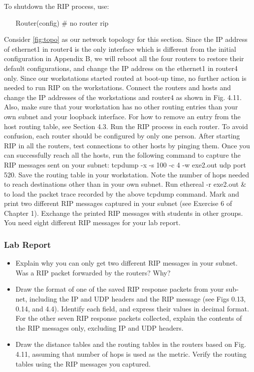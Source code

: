 \documentclass[10pt,a4paper]{article}
\numberwithin{equation}{section}
\numberwithin{figure}{section}
\numberwithin{table}{section}
\begin{document}
 To shutdown the RIP process, use:
 \begin{itemize}
	\setlength{\itemindent}{60pt}
	\item [Router(config) \#] no router rip
\end{itemize}

Consider \ref{fig:topo} as our network topology for this section. Since the IP
address of ethernet1 in router4 is the only interface which is different from the initial configuration in Appendix B, we will reboot all the four routers to restore their default configurations, and change the IP address on the ethernet1 in router4 only. Since our workstations started routed at boot-up time, no further action is needed to run RIP on the workstations.
Connect the routers and hosts and change the IP addresses of the workstations and router4 as shown in Fig. 4.11. Also, make sure that your workstation has no other routing entries than your own subnet and your loopback interface. For how to remove an entry from the host routing table, see Section 4.3.
Run the RIP process in each router. To avoid confusion, each router should be configured by only one person.
After starting RIP in all the routers, test connections to other hosts by pinging them. Once you can successfully reach all the hosts, run the following command to capture the RIP messages sent on your subnet:
tcpdump -x -s 100 -c 4 -w exe2.out udp port 520.
Save the routing table in your workstation. Note the number of hops needed to reach
destinations other than in your own subnet.
Run ethereal -r exe2.out \& to load the packet trace recorded by the above tcpdump command. Mark and print two different RIP messages captured in your subnet (see Exercise 6 of Chapter 1). Exchange the printed RIP messages with students in other groups. You need eight different RIP messages for your lab report.

\subsubsection*{ Lab Report}
\begin{itemize}
	\setlength{\itemindent}{0pt}
	\item Explain why you can only get two different RIP messages in your subnet. Was a RIP packet forwarded by the routers? Why?
	\item Draw the format of one of the saved RIP response packets from your sub- net, including the IP and UDP headers and the RIP message (see Figs 0.13, 0.14, and 4.4). Identify each field, and express their values in decimal format. \\
	For the other seven RIP response packets collected, explain the contents of
the RIP messages only, excluding IP and UDP headers.
	\item Draw the distance tables and the routing tables in the routers based on Fig. 4.11, assuming that number of hops is used as the metric. Verify the routing tables using the RIP messages you captured.
\end{itemize}
\end{document}
